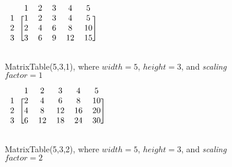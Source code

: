 \documentclass[11pt,twocolumn]{article}
\newcommand{\code}[1]{\textsf{#1}}
\begin{document}
\begin{figure}
\centering
$\begin{blockarray}{cccccc}
  & 1 & 2 & 3 & 4 & 5 \\ 
\begin{block}{c[ccccc]}
1 & 1 & 2 & 3 & 4 & 5 \\ 
2 & 2 & 4 & 6 & 8 & 10\\ 
3 & 3 & 6 & 9 & 12 & 15\\
\end{block}
\end{blockarray}$
 \caption{\code{MatrixTable(5,3,1)}, where $width = 5$, $height = 3$, and \emph{scaling} $factor =1$}
\end{figure}
 
 
 \begin{figure}
\centering
$\begin{blockarray}{cccccc}
  & 1 & 2 & 3 & 4 & 5 \\ 
\begin{block}{c[ccccc]}
1 & 2 & 4 & 6 & 8 & 10 \\ 
2 & 4 & 8 & 12 & 16 & 20\\ 
3 & 6 & 12 & 18 & 24 & 30 \\
\end{block}
\end{blockarray}$
 \caption{\code{MatrixTable(5,3,2)}, where $width = 5$, $height = 3$, and \emph{scaling} $factor =2$}
\end{figure}

%
\end{document}
